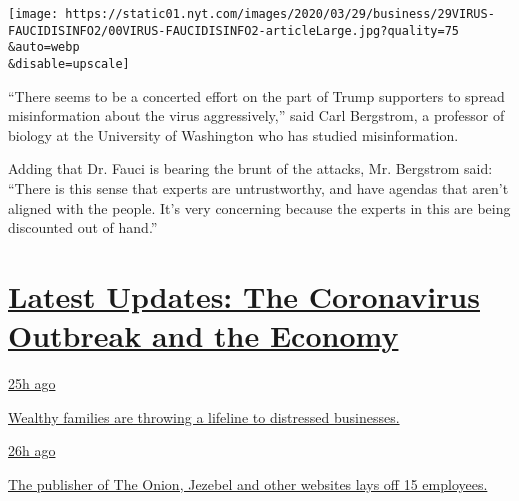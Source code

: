 \texttt{[image: https://static01.nyt.com/images/2020/03/29/business/29VIRUS-FAUCIDISINFO2/00VIRUS-FAUCIDISINFO2-articleLarge.jpg?quality=75\\\&auto=webp\\\&disable=upscale]}

``There seems to be a concerted effort on the part of Trump supporters
to spread misinformation about the virus aggressively,'' said Carl
Bergstrom, a professor of biology at the University of Washington who
has studied misinformation.

Adding that Dr. Fauci is bearing the brunt of the attacks, Mr. Bergstrom
said: ``There is this sense that experts are untrustworthy, and have
agendas that aren't aligned with the people. It's very concerning
because the experts in this are being discounted out of hand.''

\hypertarget{latest-updates-the-coronavirus-outbreak-and-the-economy}{%
\section{\texorpdfstring{\href{https://www.nytimes.com/live/2020/08/07/business/stock-market-today-coronavirus?action=click\&pgtype=Article\&state=default\&region=MAIN_CONTENT_1\&context=storylines_live_updates}{Latest
Updates: The Coronavirus Outbreak and the
Economy}}{Latest Updates: The Coronavirus Outbreak and the Economy}}\label{latest-updates-the-coronavirus-outbreak-and-the-economy}}

\href{https://www.nytimes.com/live/2020/08/07/business/stock-market-today-coronavirus?action=click\&pgtype=Article\&state=default\&region=MAIN_CONTENT_1\&context=storylines_live_updates\#wealthy-families-are-throwing-a-lifeline-to-distressed-businesses}{25h
ago}

\href{https://www.nytimes.com/live/2020/08/07/business/stock-market-today-coronavirus?action=click\&pgtype=Article\&state=default\&region=MAIN_CONTENT_1\&context=storylines_live_updates\#wealthy-families-are-throwing-a-lifeline-to-distressed-businesses}{Wealthy
families are throwing a lifeline to distressed businesses.}

\href{https://www.nytimes.com/live/2020/08/07/business/stock-market-today-coronavirus?action=click\&pgtype=Article\&state=default\&region=MAIN_CONTENT_1\&context=storylines_live_updates\#the-publisher-of-the-onion-jezebel-and-other-websites-lays-off-15-employees}{26h
ago}

\href{https://www.nytimes.com/live/2020/08/07/business/stock-market-today-coronavirus?action=click\&pgtype=Article\&state=default\&region=MAIN_CONTENT_1\&context=storylines_live_updates\#the-publisher-of-the-onion-jezebel-and-other-websites-lays-off-15-employees}{The
publisher of The Onion, Jezebel and other websites lays off 15
employees.}

